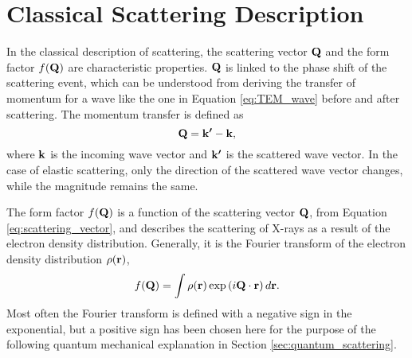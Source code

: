 

\section{Classical Scattering Description}\label{sec:classical_scattering}

In the classical description of scattering, the scattering vector $\bm{\mathrm{Q}}$ and the form factor $f(\bm{\mathrm{Q}})$ are characteristic properties.
$\bm{\mathrm{Q}}$ is linked to the phase shift of the scattering event, which can be understood from deriving the transfer of momentum for a wave like the one in Equation \eqref{eq:TEM_wave} before and after scattering.
The momentum transfer is defined as
\begin{equation}\label{eq:scattering_vector}
    \bm{\mathrm{Q}} = \bm{\mathrm{k'}} - \bm{\mathrm{k}},
\end{equation}
where $\bm{\mathrm{k}}$ is the incoming wave vector and $\bm{\mathrm{k'}}$ is the scattered wave vector.
In the case of elastic scattering, only the direction of the scattered wave vector changes, while the magnitude remains the same.

The form factor $f(\bm{\mathrm{Q}})$ is a function of the scattering vector $\bm{\mathrm{Q}}$, from Equation \eqref{eq:scattering_vector},
and describes the scattering of X-rays as a result of the electron density distribution.
Generally, it is the Fourier transform of the electron density distribution $\rho(\bm{\mathrm{r}})$,
\begin{equation}\label{eq:atomic_form_factor_classical}
    f(\bm{\mathrm{Q}}) = \int \rho(\bm{\mathrm{r}}) \exp\left(i\bm{\mathrm{Q}}\cdot\bm{\mathrm{r}}\right) d\bm{\mathrm{r}}.
\end{equation}
Most often the Fourier transform is defined with a negative sign in the exponential, but a positive sign has been chosen here for the purpose of the following quantum mechanical explanation in Section \ref{sec:quantum_scattering}.

